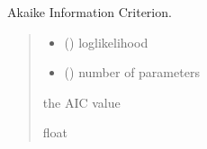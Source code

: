 \documentclass[letterpaper,10pt,english]{sphinxmanual}
\begin{document}

\begin{fulllineitems}
\label{\detokenize{cubmods:cubmods.general.aic}}
\pysigstartsignatures
{}
\pysigstopsignatures
\sphinxAtStartPar
Akaike Information Criterion.
\begin{quote}\begin{description}
\begin{itemize}
\item {} 
\sphinxAtStartPar
{} () \textendash{} log\sphinxhyphen{}likelihood

\item {} 
\sphinxAtStartPar
{} () \textendash{} number of parameters

\end{itemize}

\sphinxAtStartPar
the AIC value

\sphinxAtStartPar
float

\end{description}\end{quote}

\end{fulllineitems}

\end{document}
